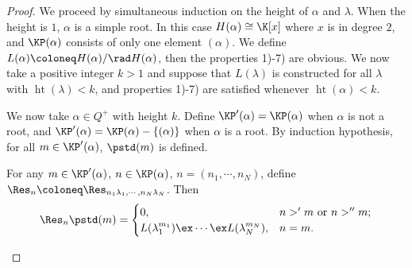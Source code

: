 \begin{proof}
    We proceed by simultaneous induction on the height of $\alpha$ and
    $\lambda$. When the height is $1$, $\alpha$ is a simple root.
    In this case $H(\alpha)\cong\K[x]$ where $x$ is in degree $2$,
    and $\KP(\alpha)$ consists of only one element $(\alpha)$. We define
    $L(\alpha) \coloneq  H(\alpha)/\rad H(\alpha)$, then the properties 1)-7)
    are obvious. We now take a positive integer $k>1$ and suppose that
    $L(\lambda)$ is constructed for all $\lambda$ with $\operatorname{ht}(\lambda)<k$,
    and properties 1)-7) are satisfied whenever $\operatorname{ht}(\alpha)<k$.

    We now take $\alpha\in Q^+$ with height $k$. Define $\KP'(\alpha) = \KP(\alpha)$
    when $\alpha$ is not a root, and $\KP'(\alpha) = \KP(\alpha)-\{(\alpha)\}$
    when $\alpha$ is a root. By induction hypothesis, for all $m\in\KP'(\alpha)$,
    $\pstd(m)$ is defined. 

    \begin{lemma}\label{res-of-proper-std}
        For any $m\in\KP'(\alpha)$, $n\in\KP(\alpha)$, $n = (n_1,\cdots,n_N)$,
        define $\Res_n \coloneq  \Res_{n_1\lambda_1,\cdots,n_N\lambda_N}$. Then 
        \[
            \Res_n\pstd(m) = 
            \begin{cases}
                0,&n>'m\text{ or }n>''m;\\
                L(\lambda_1^{m_1})\ex\cdots\ex L(\lambda_N^{m_N}),&n = m.
            \end{cases}
        \]     
    \end{lemma}


\end{proof}
